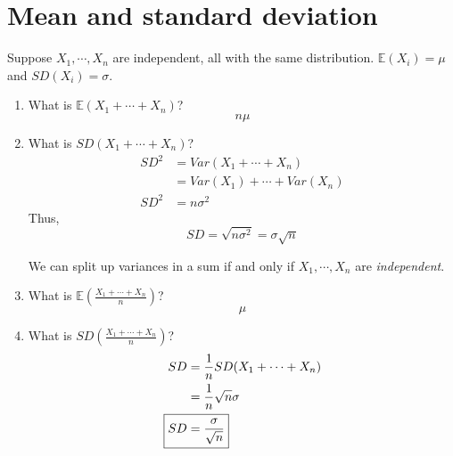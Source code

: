 \documentclass[titlepage, 12pt, leqno]{article}
\begin{document}
\section{Mean and standard deviation}
Suppose $X_1, \cdots , X_n$ are independent, all with the same distribution.
$ \mathbb{E}(X_i) = \mu$ and $SD(X_i) = \sigma$.
\begin{enumerate}
    \item What is $ \mathbb{E}(X_1 + \cdots + X_n)$?
        \[
        \boxed{n\mu} 
        \]
    \item What is $SD(X_1 + \cdots + X_n)$?
       \begin{align*}
           SD^2 &= Var(X_1 + \cdots + X_n) \\
                &= Var(X_1) + \cdots + Var(X_n) \\
           SD^2 &= n\sigma^2
       \end{align*}
       Thus,
       \[
       \boxed{SD = \sqrt{n\sigma^2} = \sigma\sqrt{n}} 
       \]
       \begin{note}
           We can split up variances in a sum if and only if $X_1, \cdots , X_n$
           are \textit{independent}.
       \end{note}
       
    \item What is $ \mathbb{E}\left(\frac{X_1+ \cdots +X_n}{n}\right)$?
        \[
        \boxed{\mu} 
        \]
    \item What is $ SD\left(\frac{X_1+ \cdots +X_n}{n}\right)$?
       \begin{align*}
           SD &= \frac{1}{n} SD(X_1 + \cdots + X_n) \\
           &= \frac{1}{n}\sqrt{n}\sigma \\
           \Aboxed{SD &= \frac{\sigma}{\sqrt{n}}} 
       \end{align*}
\end{enumerate}
\end{document}
